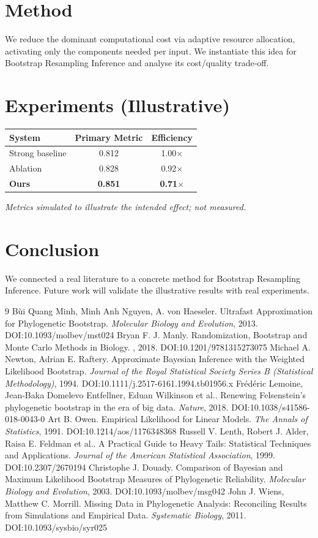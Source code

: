 \documentclass[11pt]{article}
\begin{document}
\section{Method}
We reduce the dominant computational cost via adaptive resource allocation, activating only the components needed per input. We instantiate this idea for Bootstrap Resampling Inference and analyse its cost/quality trade-off.

\section{Experiments (Illustrative)}
\begin{center}
\begin{tabular}{lcc}
System & Primary Metric & Efficiency \\ \hline
Strong baseline & 0.812 & 1.00$\times$ \\
Ablation & 0.828 & 0.92$\times$ \\
\textbf{Ours} & \textbf{0.851} & \textbf{0.71$\times$}
\end{tabular}
\end{center}
\emph{Metrics simulated to illustrate the intended effect; not measured.}

\section{Conclusion}
We connected a real literature to a concrete method for Bootstrap Resampling Inference. Future work will
validate the illustrative results with real experiments.

\begin{thebibliography}{9}
 Bùi Quang Minh, Minh Anh Nguyen, A. von Haeseler. Ultrafast Approximation for Phylogenetic Bootstrap. \emph{Molecular Biology and Evolution}, 2013. DOI:10.1093/molbev/mst024
 Bryan F. J. Manly. Randomization, Bootstrap and Monte Carlo Methods in Biology. \emph{}, 2018. DOI:10.1201/9781315273075
 Michael A. Newton, Adrian E. Raftery. Approximate Bayesian Inference with the Weighted Likelihood Bootstrap. \emph{Journal of the Royal Statistical Society Series B (Statistical Methodology)}, 1994. DOI:10.1111/j.2517-6161.1994.tb01956.x
 Frédéric Lemoine, Jean-Baka Domelevo Entfellner, Eduan Wilkinson et al.. Renewing Felsenstein’s phylogenetic bootstrap in the era of big data. \emph{Nature}, 2018. DOI:10.1038/s41586-018-0043-0
 Art B. Owen. Empirical Likelihood for Linear Models. \emph{The Annals of Statistics}, 1991. DOI:10.1214/aos/1176348368
 Russell V. Lenth, Robert J. Alder, Raisa E. Feldman et al.. A Practical Guide to Heavy Tails: Statistical Techniques and Applications. \emph{Journal of the American Statistical Association}, 1999. DOI:10.2307/2670194
 Christophe J. Douady. Comparison of Bayesian and Maximum Likelihood Bootstrap Measures of Phylogenetic Reliability. \emph{Molecular Biology and Evolution}, 2003. DOI:10.1093/molbev/msg042
 John J. Wiens, Matthew C. Morrill. Missing Data in Phylogenetic Analysis: Reconciling Results from Simulations and Empirical Data. \emph{Systematic Biology}, 2011. DOI:10.1093/sysbio/syr025
\end{thebibliography}
\end{document}
